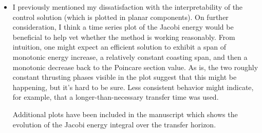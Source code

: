\documentclass[11pt]{article}
\begin{document}
\begin{itemize}
    \item
        \begin{itshape}
            I previously mentioned my dissatisfaction with the interpretability of the control solution (which is plotted in planar components).  On further consideration, I think a time series plot of the Jacobi energy would be beneficial to help vet whether the method is working reasonably.  From intuition, one might expect an efficient solution to exhibit a span of monotonic energy increase, a relatively constant coasting span, and then a monotonic decrease back to the Poincare section value.  As is, the two roughly constant thrusting phases visible in the plot suggest that this might be happening, but it's hard to be sure.  Less consistent behavior might indicate, for example, that a longer-than-necessary transfer time was used.  
        \end{itshape}
        
        Additional plots have been included in the manuscript which shows the evolution of the Jacobi energy integral over the transfer horizon.
        

\end{itemize}
\end{document}
